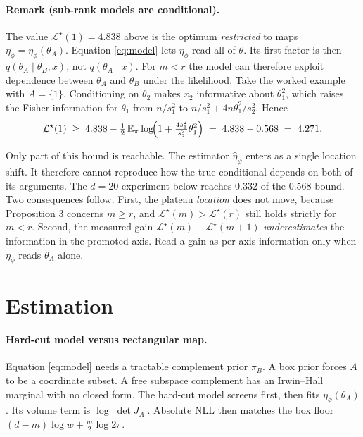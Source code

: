 \documentclass[11pt, letterpaper]{article}
\theoremstyle{definition}
\begin{document}
\paragraph{Remark (sub-rank models are conditional).}
The value $\mathcal{L}^\star(1)=4.838$ above is the optimum \emph{restricted} to
maps $\eta_\phi=\eta_\phi(\theta_A)$. Equation \eqref{eq:model} lets $\eta_\phi$
read all of $\theta$. Its first factor is then $q(\theta_A\mid\theta_B,x)$, not
$q(\theta_A\mid x)$. For $m<r$ the model can therefore exploit dependence
between $\theta_A$ and $\theta_B$ under the likelihood. Take the worked example
with $A=\{1\}$. Conditioning on $\theta_2$ makes $\bar x_2$ informative about
$\theta_1^2$, which raises the Fisher information for $\theta_1$ from $n/s_1^2$
to $n/s_1^2+4n\theta_1^2/s_2^2$. Hence
\begin{equation}
  \mathcal{L}^\star(1)\;\ge\;4.838-\tfrac12\,\mathbb{E}_\pi
  \log\!\Bigl(1+\tfrac{4s_1^2}{s_2^2}\theta_1^2\Bigr)
  \;=\;4.838-0.568\;=\;4.271 .
\end{equation}

Only part of this bound is reachable. The estimator $\hat\eta_\psi$ enters as a
single location shift. It therefore cannot reproduce how the true conditional
depends on both of its arguments. The $d=20$ experiment below reaches $0.332$
of the $0.568$ bound. Two consequences follow. First, the plateau \emph{location} does not
move, because Proposition 3 concerns $m\ge r$, and
$\mathcal{L}^\star(m)>\mathcal{L}^\star(r)$ still holds strictly for $m<r$.
Second, the measured gain $\mathcal{L}^\star(m)-\mathcal{L}^\star(m+1)$
\emph{underestimates} the information in the promoted axis. Read a gain as
per-axis information only when $\eta_\phi$ reads $\theta_A$ alone.

\section*{Estimation}

\paragraph{Hard-cut model versus rectangular map.}
Equation \eqref{eq:model} needs a tractable complement prior $\pi_B$.
A box prior forces $A$ to be a coordinate subset.
A free subspace complement has an Irwin--Hall marginal with no closed form.
The hard-cut model screens first, then fits $\eta_\phi(\theta_A)$.
Its volume term is $\log|\det J_A|$.
Absolute NLL then matches the box floor
$(d-m)\log w+\tfrac m2\log 2\pi$.
\end{document}
